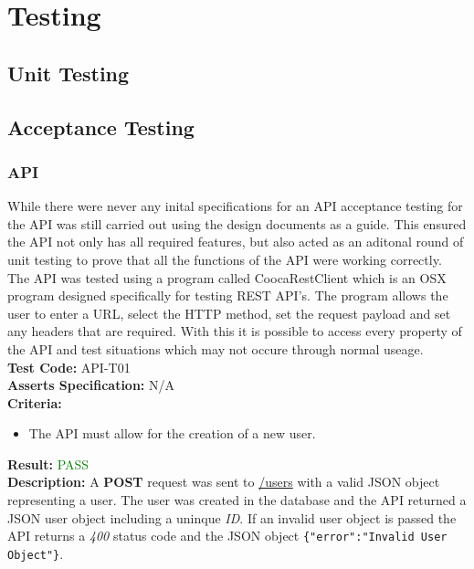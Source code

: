 \documentclass[11pt,a4paper]{report}
\begin{document}
\chapter{Testing}
\label{sec:testing}
\section{Unit Testing}
\label{sec:unit-testint}
\section{Acceptance Testing}
\label{sec:acceptance-testint}


\subsection{API}

While there were never any inital specifications for an API acceptance testing for the API was still carried out using the design documents as a guide. This ensured the API not only has all required features, but also acted as an aditonal round of unit testing to prove that all the functions of the API were working correctly. The API was tested using a program called CoocaRestClient which is an OSX program designed specifically for testing REST API's. The program allows the user to enter a URL, select the HTTP method, set the request payload and set any headers that are required. With this it is possible to access every property of the API and test situations which may not occure through normal useage. \\

\label{test:API-T01}
\noindent\textbf{Test Code:} API-T01\\
\textbf{Asserts Specification:} N/A \\ 
\textbf{Criteria:} \begin{itemize}
                     \item The API must allow for the creation of a new user.
                   \end{itemize}  
\textbf{Result:} \textcolor{green}{PASS}\\ 
\textbf{Description:} A \textbf{POST} request was sent to \url{/users} with a valid JSON object representing a user. The user was created in the database and the API returned a JSON user object including a uninque \textit{ID}. If an invalid user object is passed the API returns a \textit{400} status code and the JSON object \lstinline${"error":"Invalid User Object"}$.\\ 
\end{document}

